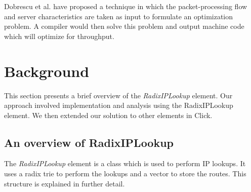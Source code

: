 \documentclass[a4paper,marginparwidth=50pt,marginparsep=10pt]{article}
\begin{document}
Dobrescu et al. \cite{dobrescu} have proposed a technique in which the packet-processing flow and server characteristics are taken as input to formulate an optimization problem. A compiler would then solve this problem and output machine code which will optimize for throughput.
\section{Background}
\label{sec:background}
This section presents a brief overview of the \emph{RadixIPLookup} element. Our approach involved implementation and analysis using the RadixIPLookup element. We then extended our solution to other elements in Click. 
\subsection{An overview of RadixIPLookup}
The \emph{RadixIPLookup} element \cite{radixiplookup} is a class which is used to perform IP lookups. It uses a radix trie to perform the lookups and a vector to store the routes. This structure is explained in further detail. 
\end{document}
